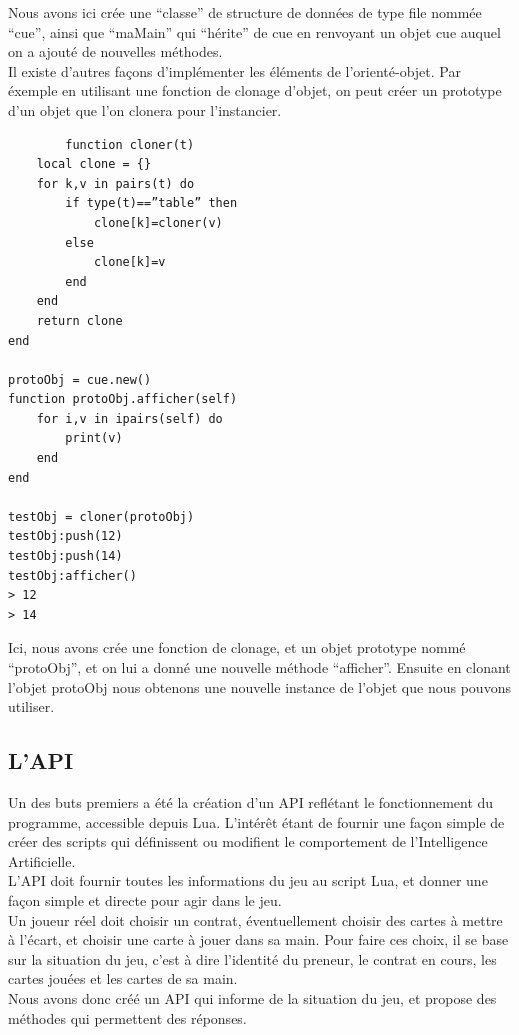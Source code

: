 \documentclass[a4paper]{report}
\begin{document}
Nous avons ici crée une “classe” de structure de données de type file nommée “cue”, ainsi que “maMain” qui “hérite” de cue en renvoyant un objet cue auquel on a ajouté de nouvelles méthodes.\\

Il existe d’autres façons d’implémenter les éléments de l’orienté-objet. Par éxemple en utilisant une fonction de clonage d’objet, on peut créer un prototype d’un objet que l’on clonera pour l’instancier.\\
		\begin{verbatim}
		function cloner(t)
    local clone = {}
    for k,v in pairs(t) do
        if type(t)==”table” then
            clone[k]=cloner(v)
        else
            clone[k]=v
        end
    end
    return clone
end

protoObj = cue.new()
function protoObj.afficher(self)
    for i,v in ipairs(self) do
        print(v)
    end
end

testObj = cloner(protoObj)
testObj:push(12)
testObj:push(14)
testObj:afficher()
> 12
> 14
\end{verbatim}

Ici, nous avons crée une fonction de clonage, et un objet prototype nommé “protoObj”, et on lui a donné une nouvelle méthode “afficher”. Ensuite en clonant l’objet protoObj nous obtenons une nouvelle instance de l’objet que nous pouvons utiliser.


		\subsection{L’API}
			Un des buts premiers a été la création d’un API reflétant le fonctionnement du programme, accessible depuis Lua. L’intérêt étant de fournir une façon simple de créer des scripts 				qui définissent ou modifient le comportement de l’Intelligence Artificielle.\\

			L’API doit fournir toutes les informations du jeu au script Lua, et donner une façon simple et directe pour agir dans le jeu.\\

			Un joueur réel doit choisir un contrat, éventuellement choisir des cartes à mettre à l’écart, et choisir une carte à jouer dans sa main. Pour faire ces choix, il se base sur la 				situation du jeu, c’est à dire l’identité du preneur, le contrat en cours, les cartes jouées et les cartes de sa main.\\

			Nous avons donc créé un API qui informe de la situation du jeu, et propose des méthodes qui permettent des réponses.\\
\end{document}
